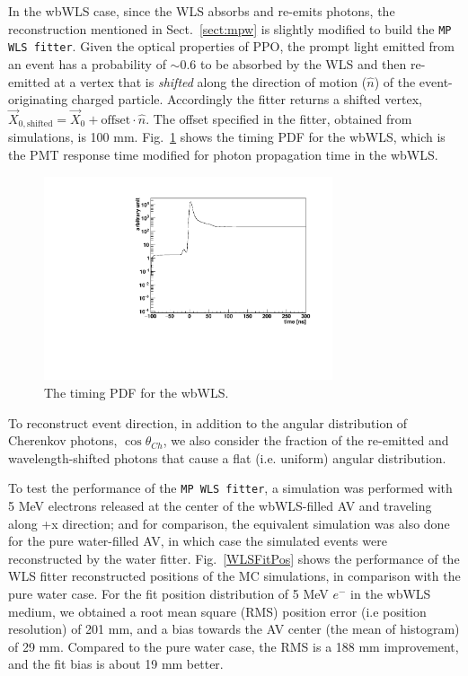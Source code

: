 In the wbWLS case, since the WLS absorbs and re-emits photons, the reconstruction mentioned in Sect.~\ref{sect:mpw} is slightly modified to build the \texttt{MP WLS fitter}. Given the optical properties of PPO, the prompt light emitted from an event has a probability of $\sim$0.6 to be absorbed by the WLS and then re-emitted at a vertex that is {\em shifted} along the direction of motion ($\hat{n}$) of the event-originating charged particle. Accordingly the fitter returns a shifted vertex, $\vec{X}_\mathrm{0,shifted}=\vec{X}_0+\mathrm{offset}\cdot\hat{n}$. The offset specified in the fitter, obtained from simulations, is 100 mm. Fig.~\ref{WLS_pdf} shows the timing PDF for the wbWLS, which is the PMT response time modified for photon propagation time in the wbWLS.

\begin{figure}[htbp]	
	\centering		
	\begin{minipage}[b]{0.5\textwidth}			
		\includegraphics[height=6cm]{WLSTime_pdf.pdf}			
	\end{minipage}%
	\caption{\label{WLS_pdf} The timing PDF for the wbWLS.}	
\end{figure}

To reconstruct event direction, in addition to the angular distribution of Cherenkov photons, $\cos\theta_{Ch}$, we also consider the fraction of the re-emitted and wavelength-shifted photons that cause a flat (i.e. uniform) angular distribution.

To test the performance of the \texttt{MP WLS fitter}, a simulation was performed with 5 MeV electrons released at the center of the wbWLS-filled AV and traveling along +x direction; and for comparison, the equivalent simulation was also done for the pure water-filled AV, in which case the simulated events were reconstructed by the water fitter. Fig.~\ref{WLSFitPos} shows the performance of the WLS fitter reconstructed positions of the MC simulations, in comparison with the pure water case. For the fit position distribution of 5 MeV $e^-$ in the wbWLS medium, we obtained a root mean square (RMS) position error (i.e position resolution) of 201 mm, and a bias towards the AV center (the mean of histogram) of 29 mm. Compared to the pure water case, the RMS is a 188 mm improvement, and the fit bias is about 19 mm better.

